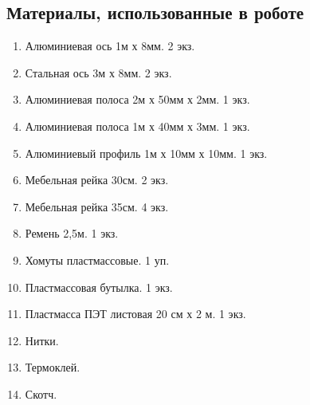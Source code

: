 
\subsection{Материалы, использованные в роботе}

\begin{enumerate}
	\item Алюминиевая ось 1м х 8мм. 2 экз.
	\item Стальная ось 3м х 8мм. 2 экз.
	\item Алюминиевая полоса 2м х 50мм х 2мм. 1 экз.
	\item Алюминиевая полоса 1м х 40мм х 3мм. 1 экз.
	\item Алюминиевый профиль 1м х 10мм х 10мм. 1 экз.
	\item Мебельная рейка 30см. 2 экз.
	\item Мебельная рейка 35см. 4 экз.
	\item Ремень 2,5м. 1 экз.
	\item Хомуты пластмассовые. 1 уп.
	\item Пластмассовая бутылка. 1 экз.
	\item Пластмасса ПЭТ листовая 20 см х 2 м. 1 экз.
	\item Нитки.
	\item Термоклей.
	\item Скотч.
\end{enumerate}
\fillpage
\newpage


